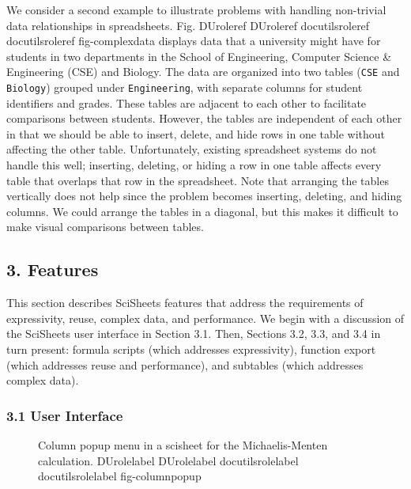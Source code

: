 \documentclass[letterpaper,compsoc,twoside]{IEEEtran}
\providecommand*{\DUrole}[2]{%
  \ifcsname DUrole#1\endcsname%
    \csname DUrole#1\endcsname{#2}%
  \else%
    \ifcsname docutilsrole#1\endcsname%
      \csname docutilsrole#1\endcsname{#2}%
    \else%
      #2%
    \fi%
  \fi%
}
\begin{document}
We consider a second example to illustrate problems with handling
non-trivial data relationships in spreadsheets.
Fig. \DUrole{ref}{fig-complexdata} displays data that a university
might have for students in two departments in the School of Engineering,
Computer Science \& Engineering (CSE) and Biology.
The data are organized into two tables
(\texttt{CSE} and \texttt{Biology}) grouped under
\texttt{Engineering}, with separate columns for student identifiers
and grades.
These tables
are adjacent to each other to facilitate comparisons between
students.
However, the tables are independent of each other
in that we should be able to insert, delete, and hide rows
in one table without affecting
the other table.
Unfortunately, existing spreadsheet systems do not handle this well;
inserting, deleting, or hiding
a row in one table affects every table that overlaps that row in the spreadsheet.
Note that arranging the tables vertically does not help since the problem
becomes inserting, deleting, and hiding columns.
We could arrange the tables in a diagonal, but
this makes it difficult to make visual comparisons between
tables.

\subsection{3. Features%
  \label{features}%
}


This section describes SciSheets features that address the requirements of expressivity, reuse, complex data,
and performance.
We begin with a discussion of the SciSheets
user interface in Section 3.1.
Then, Sections 3.2, 3.3, and 3.4 in turn present:
formula scripts (which addresses expressivity),
function export (which addresses reuse and performance),
and subtables (which addresses complex data).

\subsubsection{3.1 User Interface%
  \label{user-interface}%
}
\begin{figure}[]\noindent{}
\caption{Column popup menu in a scisheet for the Michaelis-Menten calculation. \DUrole{label}{fig-columnpopup}}
\end{figure}
\end{document}
